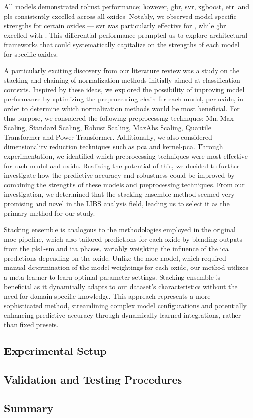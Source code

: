 All models demonstrated robust performance; however, \gls{gbr}, \gls{svr}, \gls{xgboost}, \gls{etr}, and \gls{pls} consistently excelled across all oxides. 
Notably, we observed model-specific strengths for certain oxides --- \gls{svr} was particularly effective for , while \gls{gbr} excelled with . 
This differential performance prompted us to explore architectural frameworks that could systematically capitalize on the strengths of each model for specific oxides.

A particularly exciting discovery from our literature review was a study on the stacking and chaining of normalization methods initially aimed at classification contexts. 
Inspired by these ideas, we explored the possibility of improving model performance by optimizing the preprocessing chain for each model, per oxide, in order to determine which normalization methods would be most beneficial.
For this purpose, we considered the following preprocessing techniques: Min-Max Scaling, Standard Scaling, Robust Scaling, MaxAbs Scaling, Quantile Transformer and Power Transformer. 
Additionally, we also considered dimensionality reduction techniques such as \gls{pca} and \gls{kernel-pca}.
Through experimentation, we identified which preprocessing techniques were most effective for each model and oxide. 
Realizing the potential of this, we decided to further investigate how the predictive accuracy and robustness could be improved by combining the strengths of these models and preprocessing techniques.
From our investigation, we determined that the stacking ensemble method seemed very promising and novel in the LIBS analysis field, leading us to select it as the primary method for our study.

Stacking ensemble is analogous to the methodologies employed in the original \gls{moc} pipeline, which also tailored predictions for each oxide by blending outputs from the \gls{pls1-sm} and \gls{ica} phases, variably weighting the influence of the \gls{ica} predictions depending on the oxide.
Unlike the \gls{moc} model, which required manual determination of the model weightings for each oxide, our method utilizes a meta learner to learn optimal parameter settings. 
Stacking ensemble is beneficial as it dynamically adapts to our dataset's characteristics without the need for domain-specific knowledge.
This approach represents a more sophisticated method, streamlining complex model configurations and potentially enhancing predictive accuracy through dynamically learned integrations, rather than fixed presets.

\subsection{Experimental Setup}

\subsection{Validation and Testing Procedures}


\subsection{Summary}
